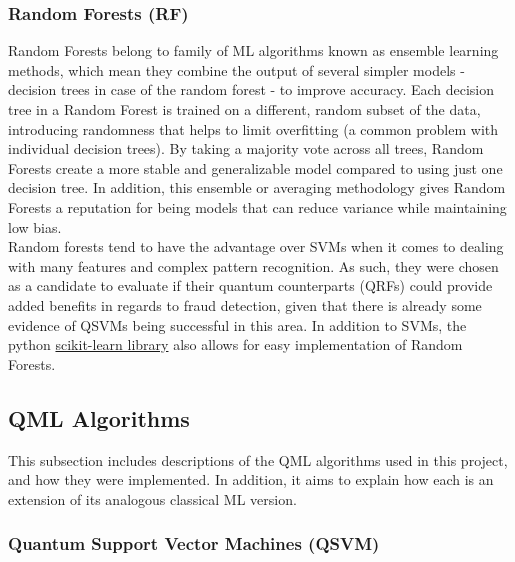 \documentclass[11pt, oneside]{article}   	%
\begin{document}
\subsubsection{Random Forests (RF)}

\hspace{10mm}Random Forests belong to family of ML algorithms known as ensemble learning methods, which mean they combine the output of several simpler models - decision trees in case of the random forest - to improve accuracy. Each decision tree in a Random Forest is trained on a different, random subset of the data, introducing randomness that helps to limit overfitting (a common problem with individual decision trees). By taking a majority vote across all trees, Random Forests create a more stable and generalizable model compared to using just one decision tree. In addition, this ensemble or averaging methodology gives Random Forests a reputation for being models that can reduce variance while maintaining low bias. \\

\noindent\hspace{10mm}Random forests tend to have the advantage over SVMs when it comes to dealing with many features and complex pattern recognition. As such, they were chosen as a candidate to evaluate if their quantum counterparts (QRFs) could provide added benefits in regards to fraud detection, given that there is already some evidence of QSVMs being successful in this area. In addition to SVMs, the python \href{https://scikit-learn.org/stable/}{scikit-learn library} also allows for easy implementation of Random Forests.

\subsection{QML Algorithms}

\hspace{10mm}This subsection includes descriptions of the QML algorithms used in this project, and how they were implemented. In addition, it aims to explain how each is an extension of its analogous classical ML version.

\subsubsection{Quantum Support Vector Machines (QSVM)}
\end{document}
